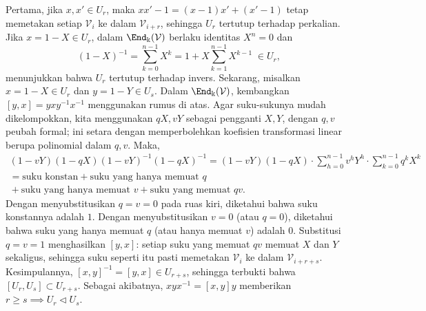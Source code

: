 \begin{example}
	Pertama, jika $x, x' \in U_r$, maka $xx' - 1 = (x-1)x' + (x'-1)$ tetap memetakan setiap $\mathcal{V}_i$ ke dalam $\mathcal{V}_{i+r}$, sehingga $U_r$ tertutup terhadap perkalian. Jika $x = 1-X \in U_r$, dalam $\End_\Bbbk(\mathcal{V})$ berlaku identitas $X^n=0$ dan
	\[ (1-X)^{-1} = \sum_{k=0}^{n-1} X^k = 1 + X \sum_{k=1}^{n-1} X^{k-1} \; \in U_r, \]
	menunjukkan bahwa $U_r$ tertutup terhadap invers. Sekarang, misalkan $x = 1-X \in U_r$ dan $y = 1-Y \in U_s$. Dalam $\End_\Bbbk(\mathcal{V})$, kembangkan $[y,x] = y x y^{-1} x^{-1}$ menggunakan rumus di atas. Agar suku-sukunya mudah dikelompokkan, kita menggunakan $qX,vY$ sebagai pengganti $X,Y$, dengan $q,v$ peubah formal; ini setara dengan memperbolehkan koefisien transformasi linear berupa polinomial dalam $q,v$. Maka,
	\begin{multline*}
		(1-vY) (1-qX) (1-vY)^{-1} (1-qX)^{-1} = (1-vY) (1-qX) \cdot \sum_{h=0}^{n-1} v^h Y^h \cdot \sum_{k=0}^{n-1} q^k X^k \\
		= \text{suku konstan} + \text{suku yang hanya memuat $q$} \\ {}+ \text{suku yang hanya memuat $v$} + \text{suku yang memuat $qv$}.
	\end{multline*}
	Dengan menyubstitusikan $q=v=0$ pada ruas kiri, diketahui bahwa suku konstannya adalah $1$. Dengan menyubstitusikan $v=0$ (atau $q=0$), diketahui bahwa suku yang hanya memuat $q$ (atau hanya memuat $v$) adalah $0$. Substitusi $q=v=1$ menghasilkan $[y,x]$: setiap suku yang memuat $qv$ memuat $X$ dan $Y$ sekaligus, sehingga suku seperti itu pasti memetakan $\mathcal{V}_i$ ke dalam $\mathcal{V}_{i+r+s}$. Kesimpulannya, $[x,y]^{-1} = [y,x] \in U_{r+s}$, sehingga terbukti bahwa $[U_r, U_s] \subset U_{r+s}$. Sebagai akibatnya, $xyx^{-1} = [x,y]y$ memberikan $r \geq s \implies U_r \lhd U_s$.
	

\end{example}
